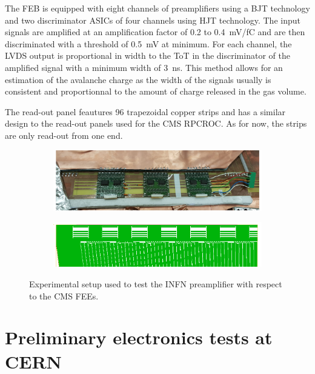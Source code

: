 	The FEB is equipped with eight channels of preamplifiers using a \acf{BJT} technology and two discriminator ASICs of four channels using \acf{HJT} technology. The input signals are amplified at an amplification factor of 0.2 to \SI{0.4}{mV/fC} and are then discriminated with a threshold of \SI{0.5}{mV} at minimum. For each channel, the LVDS output is proportional in width to the \acl{ToT} in the discriminator of the amplified signal with a minimum width of \SI{3}{ns}. This method allows for an estimation of the avalanche charge as the width of the signals usually is consistent and proportionnal to the amount of charge released in the gas volume.
	
	The read-out panel feautures 96 trapezoidal copper strips and has a similar design to the read-out panels used for the CMS RPCROC. As for now, the strips are only read-out from one end.
	 
	\begin{figure}[H]
		\begin{subfigure}{\linewidth}
		    \centering
			\includegraphics[width = 0.8\linewidth]{fig/chapt6/INFN-FEB-on-readout.png}
			\caption{\label{fig:INFN-FEBv2:A}}
		\end{subfigure}
		\begin{subfigure}{\linewidth}
		    \centering
			\includegraphics[width = 0.8\linewidth]{fig/chapt6/INFN-FEB-readout-panel.png}
			\caption{\label{fig:INFN-FEBv2:B}}
		\end{subfigure}
		\caption{\label{fig:INFN-FEBv2} Experimental setup used to test the INFN preamplifier with respect to the CMS FEEs.}
    \end{figure}

\section{Preliminary electronics tests at CERN}
\label{chapt6:sec:Preliminary}

